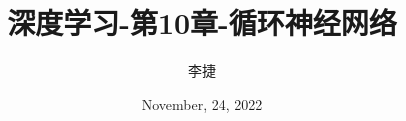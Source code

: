 \documentclass[14pt,aspectratio=169,hyperref={CJKbookmarks=true}]{beamer}
\title{深度学习-第10章-循环神经网络}
\author{李捷}
\institute{ECNU}
\date{November, 24, 2022}
\begin{document}
\begin{frame}
    \titlepage
\end{frame}
\end{document}
